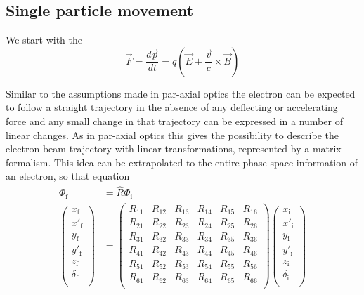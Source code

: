\subsection{Single particle movement}

We start with the 
\begin{equation}
\vec{F}=\frac{d\vec{p}}{dt}=q(\vec{E}+\frac{\vec{v}}{c}\times\vec{B})
\end{equation}

Similar to the assumptions made in par-axial optics the electron can be expected to 
follow a straight trajectory in the absence of any deflecting or accelerating force and any small change in that trajectory 
can be expressed in a number of linear changes. 
As in par-axial optics this gives the possibility to describe the electron beam trajectory with linear transformations, represented by a matrix formalism.
This idea can be extrapolated to the entire phase-space information of an electron, so that equation
\begin{equation}
\label{eqn:R_Matrix}
\begin{split}
\Phi_\mathrm{f}&=\hat{R} \Phi_\mathrm{i} \\
\begin{pmatrix}
x_\mathrm{f}\\
x'_\mathrm{f}\\
y_\mathrm{f}\\
y'_\mathrm{f}\\
z_\mathrm{f}\\
\delta_\mathrm{f}\\
\end{pmatrix}
&=
\begin{pmatrix}
R_{11}&R_{12}&R_{13}&R_{14}&R_{15}&R_{16}\\
R_{21}&R_{22}&R_{23}&R_{24}&R_{25}&R_{26}\\
R_{31}&R_{32}&R_{33}&R_{34}&R_{35}&R_{36}\\
R_{41}&R_{42}&R_{43}&R_{44}&R_{45}&R_{46}\\
R_{51}&R_{52}&R_{53}&R_{54}&R_{55}&R_{56}\\
R_{61}&R_{62}&R_{63}&R_{64}&R_{65}&R_{66}\\
\end{pmatrix}
\begin{pmatrix}
x_\mathrm{i}\\
x'_\mathrm{i}\\
y_\mathrm{i}\\
y'_\mathrm{i}\\
z_\mathrm{i}\\
\delta_\mathrm{i}\\
\end{pmatrix}
\end{split}
\end{equation}

